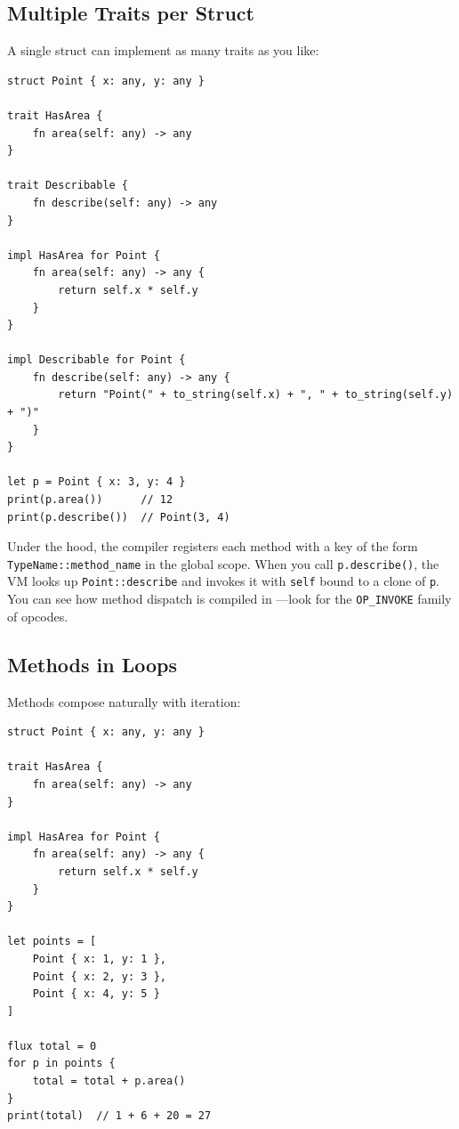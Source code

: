 \subsection{Multiple Traits per Struct}

A single struct can implement as many traits as you like:

\begin{lstlisting}[language=Lattice, caption={A struct implementing multiple traits}]
struct Point { x: any, y: any }

trait HasArea {
    fn area(self: any) -> any
}

trait Describable {
    fn describe(self: any) -> any
}

impl HasArea for Point {
    fn area(self: any) -> any {
        return self.x * self.y
    }
}

impl Describable for Point {
    fn describe(self: any) -> any {
        return "Point(" + to_string(self.x) + ", " + to_string(self.y) + ")"
    }
}

let p = Point { x: 3, y: 4 }
print(p.area())      // 12
print(p.describe())  // Point(3, 4)
\end{lstlisting}

Under the hood, the compiler registers each method with a key of the form
\texttt{TypeName::method\_name} in the global scope. When you call
\lstinline|p.describe()|, the VM looks up \texttt{Point::describe} and
invokes it with \lstinline|self| bound to a clone of \lstinline|p|. You can
see how method dispatch is compiled in ---look
for the \texttt{OP\_INVOKE} family of opcodes.

\subsection{Methods in Loops}

Methods compose naturally with iteration:

\begin{lstlisting}[language=Lattice, caption={Calling methods in a loop}]
struct Point { x: any, y: any }

trait HasArea {
    fn area(self: any) -> any
}

impl HasArea for Point {
    fn area(self: any) -> any {
        return self.x * self.y
    }
}

let points = [
    Point { x: 1, y: 1 },
    Point { x: 2, y: 3 },
    Point { x: 4, y: 5 }
]

flux total = 0
for p in points {
    total = total + p.area()
}
print(total)  // 1 + 6 + 20 = 27
\end{lstlisting}

